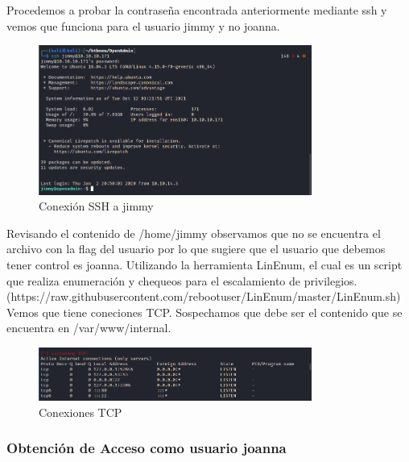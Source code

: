 \documentclass{article}
\begin{document}
Procedemos a probar la contraseña encontrada anteriormente mediante ssh y vemos que funciona para el usuario jimmy y no joanna.
\begin{figure}[H]
	\center
	\includegraphics[width=0.8\textwidth]{images/openadmin/10-sshjimmy.png}
	\caption{Conexión SSH a jimmy}
\end{figure}

Revisando el contenido de /home/jimmy observamos que no se encuentra el archivo con la flag del usuario por lo que sugiere que el usuario que debemos tener control es joanna.
Utilizando la herramienta LinEnum, el cual es un script que realiza enumeración y chequeos para el escalamiento de privilegios. (https://raw.githubusercontent.com/rebootuser/LinEnum/master/LinEnum.sh) Vemos que tiene coneciones TCP. Sospechamos que debe ser el contenido que se encuentra en /var/www/internal.
\begin{figure}[H]
	\center
	\includegraphics[width=0.8\textwidth]{images/openadmin/11-tcp.png}
	\caption{Conexiones TCP}
\end{figure}

\subsubsection{Obtención de Acceso como usuario joanna}
\end{document}
